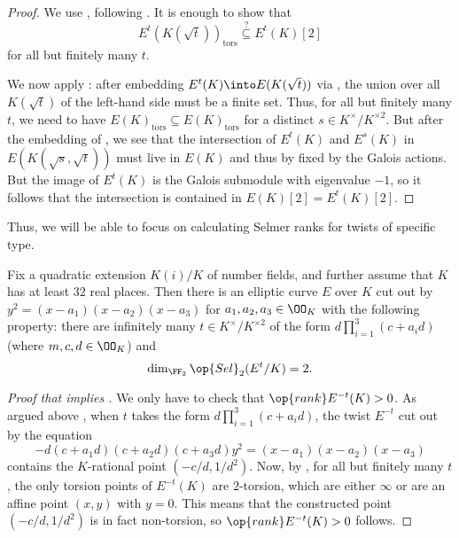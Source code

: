 \documentclass[../notes.tex]{subfiles}
\begin{document}
\begin{proof}
	We use , following \cite[Lemma~3.2]{koymans-pagano-h10}. It is enough to show that
	\[E^t(K(\sqrt t))_{\mathrm{tors}}\stackrel?\subseteq E^t(K)[2]\]
	for all but finitely many $t$.
	
	We now apply : after embedding $E^t(K)\into E(K(\sqrt t))$ via , the union over all $K(\sqrt t)$ of the left-hand side must be a finite set. Thus, for all but finitely many $t$, we need to have $E(K)_{\mathrm{tors}}\subseteq E(K)_{\mathrm{tors}}$ for a distinct $s\in K^\times/K^{\times2}$. But after the embedding of , we see that the intersection of $E^t(K)$ and $E^s(K)$ in $E(K(\sqrt s,\sqrt t))$ must live in $E(K)$ and thus by fixed by the Galois actions. But the image of $E^t(K)$ is the Galois submodule with eigenvalue $-1$, so it follows that the intersection is contained in $E(K)[2]=E^t(K)[2]$.
\end{proof}
Thus, we will be able to focus on calculating Selmer ranks for twists of specific type.
\begin{theorem} \label{thm:kp-selmer-rank}
	Fix a quadratic extension $K(i)/K$ of number fields, and further assume that $K$ has at least $32$ real places. Then there is an elliptic curve $E$ over $K$ cut out by $y^2=(x-a_1)(x-a_2)(x-a_3)$ for $a_1,a_2,a_3\in\OO_K$ with the following property: there are infinitely many $t\in K^\times/K^{\times2}$ of the form $d\prod_{i=1}^3(c+a_id)$ (where $m,c,d\in\OO_K$) and
	\[\dim_{\FF_2}\op{Sel}_2(E^t/K)=2.\]
\end{theorem}
\begin{proof}[Proof that  implies ]
	We only have to check that $\op{rank}E^{-t}(K)>0$. As argued above , when $t$ takes the form $d\prod_{i=1}^3(c+a_id)$, the twist $E^{-t}$ cut out by the equation
	\[-d(c+a_1d)(c+a_2d)(c+a_3d)y^2=(x-a_1)(x-a_2)(x-a_3)\]
	contains the $K$-rational point $\left(-c/d,1/d^2\right)$. Now, by , for all but finitely many $t$, the only torsion points of $E^{-t}(K)$ are $2$-torsion, which are either $\infty$ or are an affine point $(x,y)$ with $y=0$. This means that the constructed point $\left(-c/d,1/d^2\right)$ is in fact non-torsion, so $\op{rank}E^{-t}(K)>0$ follows.
\end{proof}
\end{document}
